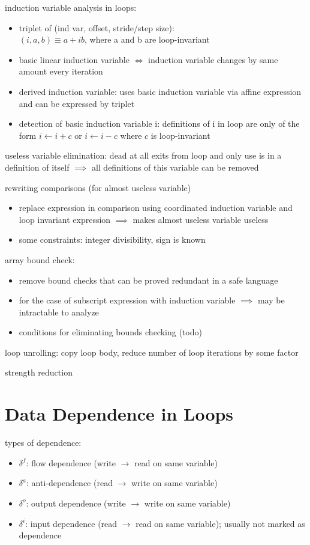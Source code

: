 \documentclass[8pt]{extarticle}
\begin{document}
\begin{multicols*}{2}
  induction variable analysis in loops:
  \begin{itemize}
  \item triplet of (ind var, offset, stride/step size):\\ $(i, a, b) \equiv a + ib$, where a and b are loop-invariant
  \item basic linear induction variable $\iff$ induction variable changes by same amount every iteration
  \item derived induction variable: uses basic induction variable via affine expression and can be expressed by triplet
  \item detection of basic induction variable i: definitions of i in loop are only of the form $i\leftarrow i+c$ or $i\leftarrow i-c$ where $c$ is loop-invariant
  \end{itemize}
  
  useless variable elimination: dead at all exits from loop and only use is in a definition of itself $\implies$ all definitions of this variable can be removed

  rewriting comparisons (for almost useless variable)
  \begin{itemize}
  \item replace expression in comparison using coordinated induction variable and loop invariant expression $\implies$ makes almost useless variable useless
  \item some constraints: integer divisibility, sign is known
  \end{itemize}

  array bound check:
  \begin{itemize}
  \item remove bound checks that can be proved redundant in a safe language
  \item for the case of subscript expression with induction variable $\implies$ may be intractable to analyze
  \item conditions for eliminating bounds checking (todo)
  \end{itemize}

  loop unrolling: copy loop body, reduce number of loop iterations by some factor

  strength reduction

  \section{Data Dependence in Loops}
  types of dependence:
  \begin{itemize}
  \item $\delta^f$: flow dependence (write $\rightarrow$ read on same variable)
  \item $\delta^a$: anti-dependence (read $\rightarrow$ write on same variable)
  \item $\delta^o$: output dependence (write $\rightarrow$ write on same variable)
  \item $\delta^i$: input dependence (read $\rightarrow$ read on same variable); usually not marked as dependence
  \end{itemize}


\end{multicols*}
\end{document}
